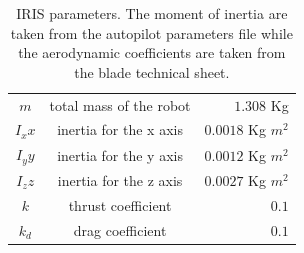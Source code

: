 \begin{table}[h]
\centering
\begin{tabular}{c c r}
\hline
$m$ & total mass of the robot & $1.308$ Kg \\
$I_xx$& inertia for the x axis& $0.0018$ Kg $m^2$ \\
$I_yy$& inertia for the y axis& $0.0012$ Kg $m^2$ \\
$I_zz$& inertia for the z axis& $0.0027$ Kg $m^2$ \\ \hline
$k$   & thrust coefficient & $0.1$ \\
$k_d$ & drag coefficient & $ 0.1$ \\
\end{tabular}
\caption{IRIS parameters. The moment of inertia are taken from the autopilot parameters file while the aerodynamic coefficients are taken from the blade technical sheet.}
\end{table}















